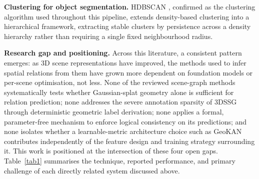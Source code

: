 \documentclass[sn-mathphys,Numbered]{sn-jnl}
\begin{document}
\textbf{Clustering for object segmentation.} HDBSCAN \cite{mcinnes2017hdbscan}, confirmed as the clustering algorithm used throughout this pipeline, extends density-based clustering into a hierarchical framework, extracting stable clusters by persistence across a density hierarchy rather than requiring a single fixed neighbourhood radius.

\textbf{Research gap and positioning.} Across this literature, a consistent pattern emerges: as 3D scene representations have improved, the methods used to infer spatial relations from them have grown more dependent on foundation models or per-scene optimisation, not less. None of the reviewed scene-graph methods systematically tests whether Gaussian-splat geometry alone is sufficient for relation prediction; none addresses the severe annotation sparsity of 3DSSG through deterministic geometric label derivation; none applies a formal, parameter-free mechanism to enforce logical consistency on its predictions; and none isolates whether a learnable-metric architecture choice such as GeoKAN contributes independently of the feature design and training strategy surrounding it. This work is positioned at the intersection of these four open gaps. Table~\ref{tab1} summarises the technique, reported performance, and primary challenge of each directly related system discussed above.
\end{document}
